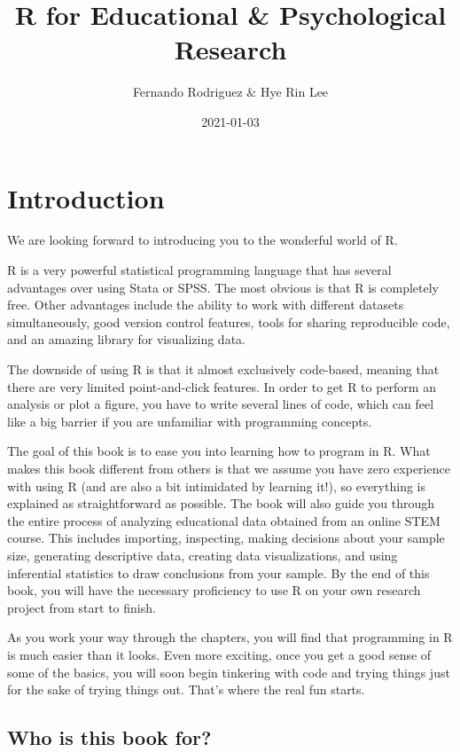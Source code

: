 \documentclass[
]{book}
\title{R for Educational \& Psychological Research}
\author{Fernando Rodriguez \& Hye Rin Lee}
\date{2021-01-03}
\begin{document}
\frontmatter
\maketitle

{
\setcounter{tocdepth}{1}
\tableofcontents
}
\mainmatter
\hypertarget{introduction}{%
\chapter{Introduction}\label{introduction}}

We are looking forward to introducing you to the wonderful world of R.

R is a very powerful statistical programming language that has several advantages over using Stata or SPSS. The most obvious is that R is completely free. Other advantages include the ability to work with different datasets simultaneously, good version control features, tools for sharing reproducible code, and an amazing library for visualizing data.

The downside of using R is that it almost exclusively code-based, meaning that there are very limited point-and-click features. In order to get R to perform an analysis or plot a figure, you have to write several lines of code, which can feel like a big barrier if you are unfamiliar with programming concepts.

The goal of this book is to ease you into learning how to program in R. What makes this book different from others is that we assume you have zero experience with using R (and are also a bit intimidated by learning it!), so everything is explained as straightforward as possible. The book will also guide you through the entire process of analyzing educational data obtained from an online STEM course. This includes importing, inspecting, making decisions about your sample size, generating descriptive data, creating data visualizations, and using inferential statistics to draw conclusions from your sample. By the end of this book, you will have the necessary proficiency to use R on your own research project from start to finish.

As you work your way through the chapters, you will find that programming in R is much easier than it looks. Even more exciting, once you get a good sense of some of the basics, you will soon begin tinkering with code and trying things just for the sake of trying things out. That's where the real fun starts.

\hypertarget{who-is-this-book-for}{%
\section{Who is this book for?}\label{who-is-this-book-for}}
\end{document}
